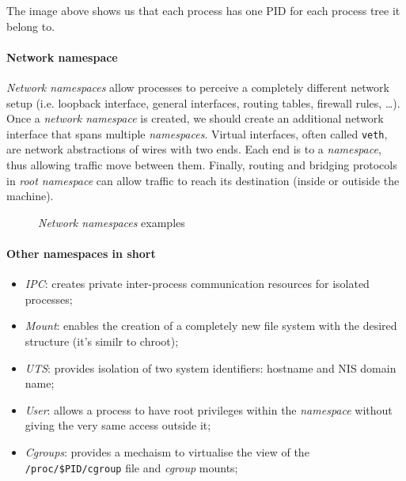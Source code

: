 \begin{note}
    The image above shows us that each process has one PID for each process
    tree it belong to.
\end{note}

\paragraph{Network namespace}
\emph{Network namespaces} allow processes to perceive a completely different
network setup (i.e. loopback interface, general interfaces, routing tables,
firewall rules, \dots). Once a \emph{network namespace} is created, we should
create an additional  network interface that spans multiple
\emph{namespaces}. Virtual interfaces, often called \texttt{veth}, are network
abstractions of wires with two ends. Each end is  to a
\emph{namespace}, thus allowing traffic move between them.
Finally, routing and bridging protocols in \emph{root namespace} can allow
traffic to reach its destination (inside or outiside the machine).

\begin{figure}[h!]
    \centering
    \hfill
    \caption{\emph{Network namespaces} examples}
\end{figure}

\paragraph{Other namespaces in short}
\begin{itemize}
    \item \emph{IPC}: creates private inter-process communication resources for
    isolated processes;
    \item \emph{Mount}: enables the creation of a completely new file system
    with the desired structure (it's similr to chroot);
    \item \emph{UTS}: provides isolation of two system identifiers: hostname and
    NIS domain name;
    \item \emph{User}: allows a process to have root privileges within the
    \emph{namespace} without giving the very same access outside it;
    \item \emph{Cgroups}: provides a mechaism to virtualise the view of the
    \texttt{/proc/\$PID/cgroup} file and \emph{cgroup} mounts;
\end{itemize}

